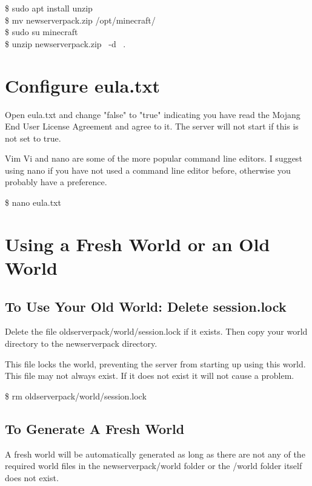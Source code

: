 \documentclass{report}
\begin{document}
\begin{mdframed}[style=Code]
	\$ sudo apt install unzip\\
	\$ mv newserverpack.zip /opt/minecraft/\\
	\$ sudo su minecraft\\
	\$ unzip newserverpack.zip ~-d ~.
\end{mdframed}

\section{Configure eula.txt}
Open eula.txt and change "false" to "true" indicating you have read the Mojang End User License Agreement and agree to it. The server will not start if this is not set to true.

\begin{mdframed}[style=Note, frametitle=Command Line Editor Note:]
Vim Vi and nano are some of the more popular command line editors. I suggest using nano if you have not used a command line editor before, otherwise you probably have a preference.
	\begin{mdframed}[style=Code]
	\$ nano eula.txt
	\end{mdframed}
\end{mdframed}

\section{Using a Fresh World or an Old World}
\subsection{To Use Your Old World: Delete session.lock}
Delete the file oldserverpack/world/session.lock if it exists. Then copy your world directory to the newserverpack directory.

\begin{mdframed}[style=Note, frametitle=Note: session.lock]
This file locks the world, preventing the server from starting up using this world. This file may not always exist. If it does not exist it will not cause a problem.
\end{mdframed}

\begin{mdframed}[style=Code]
\$ rm oldserverpack/world/session.lock\\
\end{mdframed}

\subsection{To Generate A Fresh World}
A fresh world will be automatically generated as long as there are not any of the required world files in the newserverpack/world folder or the /world folder itself does not exist.
\end{document}
